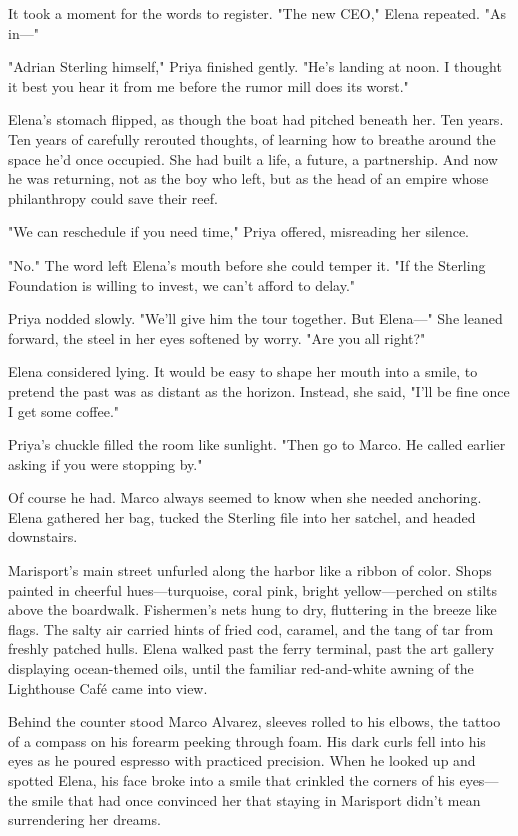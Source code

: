 It took a moment for the words to register. "The new CEO," Elena repeated. "As in—"

"Adrian Sterling himself," Priya finished gently. "He's landing at noon. I thought it best you hear it from me before the rumor mill does its worst."

Elena's stomach flipped, as though the boat had pitched beneath her. Ten years. Ten years of carefully rerouted thoughts, of learning how to breathe around the space he'd once occupied. She had built a life, a future, a partnership. And now he was returning, not as the boy who left, but as the head of an empire whose philanthropy could save their reef.

"We can reschedule if you need time," Priya offered, misreading her silence.

"No." The word left Elena's mouth before she could temper it. "If the Sterling Foundation is willing to invest, we can't afford to delay."

Priya nodded slowly. "We'll give him the tour together. But Elena—" She leaned forward, the steel in her eyes softened by worry. "Are you all right?"

Elena considered lying. It would be easy to shape her mouth into a smile, to pretend the past was as distant as the horizon. Instead, she said, "I'll be fine once I get some coffee."

Priya's chuckle filled the room like sunlight. "Then go to Marco. He called earlier asking if you were stopping by."

Of course he had. Marco always seemed to know when she needed anchoring. Elena gathered her bag, tucked the Sterling file into her satchel, and headed downstairs.

Marisport's main street unfurled along the harbor like a ribbon of color. Shops painted in cheerful hues—turquoise, coral pink, bright yellow—perched on stilts above the boardwalk. Fishermen's nets hung to dry, fluttering in the breeze like flags. The salty air carried hints of fried cod, caramel, and the tang of tar from freshly patched hulls. Elena walked past the ferry terminal, past the art gallery displaying ocean-themed oils, until the familiar red-and-white awning of the Lighthouse Café came into view.

Behind the counter stood Marco Alvarez, sleeves rolled to his elbows, the tattoo of a compass on his forearm peeking through foam. His dark curls fell into his eyes as he poured espresso with practiced precision. When he looked up and spotted Elena, his face broke into a smile that crinkled the corners of his eyes—the smile that had once convinced her that staying in Marisport didn't mean surrendering her dreams.

